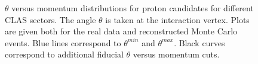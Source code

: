 
\begin{figure}[htp]
\begin{center}
\caption{\small $\theta$ versus momentum distributions for proton candidates for different CLAS sectors. The angle $\theta$ is taken at the interaction vertex. Plots are given both for the real data and reconstructed Monte Carlo events. Blue lines correspond to $\theta^{min}$ and $\theta^{max}$. Black curves correspond to additional fiducial $\theta$ versus momentum cuts. \label{fig:th_vs_p_pr}}
\end{center}
\end{figure}

\clearpage

